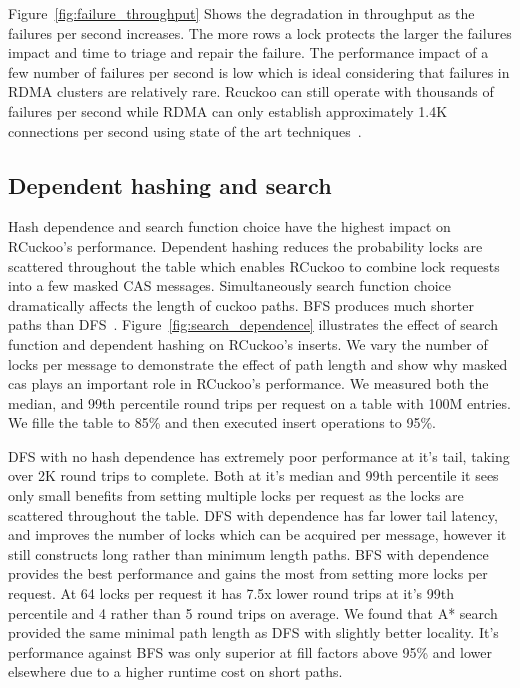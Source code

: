 Figure~\ref{fig:failure_throughput} Shows the degradation in
throughput as the failures per second increases. The more
rows a lock protects the larger the failures impact and time
to triage and repair the failure. The performance impact of
a few number of failures per second is low which is ideal
considering that failures in RDMA clusters are relatively
rare. Rcuckoo can still operate with thousands of failures
per second while RDMA can only establish approximately 1.4K
connections per second using state of the art
techniques~\cite{xrdma}.

\subsection{Dependent hashing and search}

Hash dependence and search function choice have the highest
impact on RCuckoo's performance. Dependent hashing reduces
the probability locks are scattered throughout the table
which enables RCuckoo to combine lock requests into a few
masked CAS messages. Simultaneously search function choice
dramatically affects the length of cuckoo paths. BFS
produces much shorter paths than
DFS~\cite{cuckoo-improvements,pilaf,cuckoo}.
Figure~\ref{fig:search_dependence} illustrates the effect of
search function and dependent hashing on RCuckoo's inserts.
We vary the number of locks per message to demonstrate the
effect of path length and show why masked cas plays an
important role in RCuckoo's performance. We measured both
the median, and 99th percentile round trips per request on a
table with 100M entries. We fille the table to 85\% and then
executed insert operations to 95\%.

DFS with no hash dependence has extremely poor performance
at it's tail, taking over 2K round trips to complete. Both
at it's median and 99th percentile it sees only small
benefits from setting multiple locks per request as the
locks are scattered throughout the table. DFS with
dependence has far lower tail latency, and improves the
number of locks which can be acquired per message, however
it still constructs long rather than minimum length paths.
BFS with dependence provides the best performance and gains
the most from setting more locks per request. At 64 locks
per request it has 7.5x lower round trips at it's 99th
percentile and 4 rather than 5 round trips on average. We
found that A* search provided the same minimal path length
as DFS with slightly better locality. It's performance
against BFS was only superior at fill factors above 95\% and
lower elsewhere due to a higher runtime cost on short paths.



